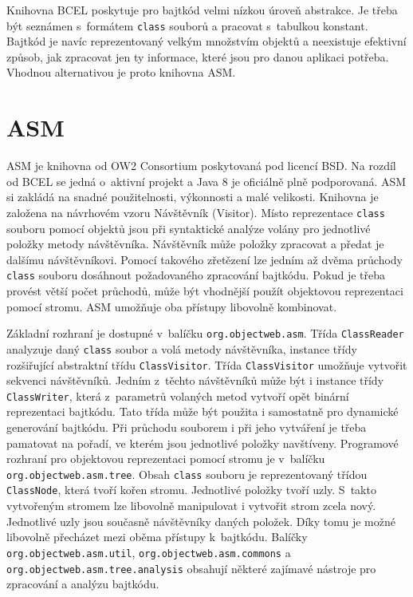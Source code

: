 Knihovna BCEL poskytuje pro bajtkód velmi nízkou úroveň abstrakce. Je třeba být seznámen s~formátem \texttt{class} souborů a pracovat s~tabulkou konstant. Bajtkód je navíc reprezentovaný velkým množstvím objektů a neexistuje efektivní způsob, jak zpracovat jen ty informace, které jsou pro danou aplikaci potřeba. Vhodnou alternativou je proto knihovna ASM.

\section{ASM}\label{Tools:ASM}

ASM \cite{ASM} je knihovna od OW2 Consortium poskytovaná pod licencí BSD. Na rozdíl od BCEL se jedná o~aktivní projekt a Java 8 je oficiálně plně podporovaná. ASM si zakládá na snadné použitelnosti, výkonnosti a malé velikosti. 
Knihovna je založena na návrhovém vzoru Návštěvník (Visitor). Místo reprezentace \texttt{class} souboru pomocí objektů jsou při syntaktické analýze volány pro jednotlivé položky metody návštěvníka. Návštěvník může položky zpracovat a předat je dalšímu návštěvníkovi. Pomocí takového zřetězení lze jedním až dvěma průchody \texttt{class} souboru dosáhnout požadovaného zpracování bajtkódu. Pokud je třeba provést větší počet průchodů, může být vhodnější použít objektovou reprezentaci pomocí stromu. ASM umožňuje oba přístupy libovolně kombinovat.

Základní rozhraní je dostupné v~balíčku \texttt{org.objectweb.asm}. Třída \texttt{ClassReader} analyzuje daný \texttt{class} soubor a volá metody návštěvníka, instance třídy rozšiřující abstraktní třídu \texttt{ClassVisitor}. Třída \texttt{ClassVisitor} umožňuje vytvořit sekvenci návštěvníků. Jedním z~těchto návštěvníků může být i instance třídy \texttt{ClassWriter}, která z~parametrů volaných metod vytvoří opět binární reprezentaci bajtkódu. Tato třída může být použita i samostatně pro dynamické generování bajtkódu. Při průchodu souborem i při jeho vytváření je třeba pamatovat na pořadí, ve kterém jsou jednotlivé položky navštíveny.
Programové rozhraní pro objektovou reprezentaci pomocí stromu je v~balíčku \texttt{org.objectweb.asm.tree}. Obsah \texttt{class} souboru je reprezentovaný třídou \texttt{ClassNode}, která tvoří kořen stromu. Jednotlivé položky tvoří uzly. S~takto vytvořeným stromem lze libovolně manipulovat i vytvořit strom zcela nový. Jednotlivé uzly jsou současně návštěvníky daných položek. Díky tomu je možné libovolně přecházet mezi oběma přístupy k~bajtkódu.
Balíčky \texttt{org.objectweb.asm.util}, \texttt{org.objectweb.asm.commons} a \texttt{org.objectweb.asm.tree.analysis} obsahují některé zajímavé nástroje pro zpracování a analýzu bajtkódu.

